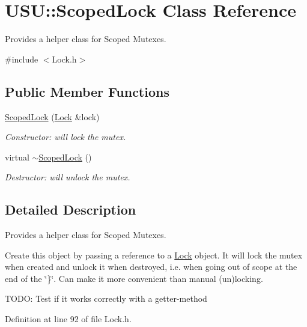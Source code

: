 \hypertarget{class_u_s_u_1_1_scoped_lock}{\section{\-U\-S\-U\-:\-:\-Scoped\-Lock \-Class \-Reference}
\label{class_u_s_u_1_1_scoped_lock}
}


\-Provides a helper class for \-Scoped \-Mutexes.  




{\ttfamily \#include $<$\-Lock.\-h$>$}

\subsection*{\-Public \-Member \-Functions}
\begin{DoxyCompactItemize}
\item 
\hyperlink{class_u_s_u_1_1_scoped_lock_aa92db605fefa48f75be29b86ad0d6186}{\-Scoped\-Lock} (\hyperlink{class_u_s_u_1_1_lock}{\-Lock} \&lock)
\begin{DoxyCompactList}\small\item\em \-Constructor\-: will lock the mutex. \end{DoxyCompactList}\item 
virtual \hyperlink{class_u_s_u_1_1_scoped_lock_a5cf581cbe18004e6fec30724c5f94071}{$\sim$\-Scoped\-Lock} ()
\begin{DoxyCompactList}\small\item\em \-Destructor\-: will unlock the mutex. \end{DoxyCompactList}\end{DoxyCompactItemize}


\subsection{\-Detailed \-Description}
\-Provides a helper class for \-Scoped \-Mutexes. 

\-Create this object by passing a reference to a \hyperlink{class_u_s_u_1_1_lock}{\-Lock} object. \-It will lock the mutex when created and unlock it when destroyed, i.\-e. when going out of scope at the end of the \char`\"{}\}\char`\"{}. \-Can make it more convenient than manual (un)locking.

\-T\-O\-D\-O\-: \-Test if it works correctly with a getter-\/method 

\-Definition at line 92 of file \-Lock.\-h.




